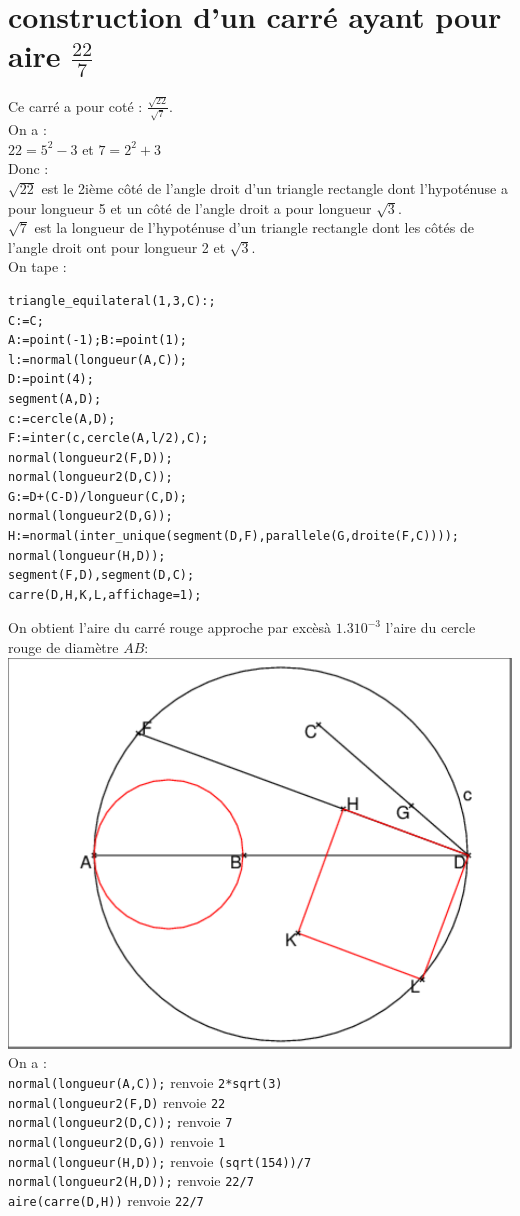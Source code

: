 \documentclass[a4paper,11pt]{book}
\begin{document}
\section{construction d'un carr\'e ayant pour aire $\frac{22}{7}$}
Ce carr\'e a pour cot\'e : $\frac{\sqrt{22}}{\sqrt 7}$.\\
On a :\\
$22=5^2-3$ et $7=2^2+3$\\
Donc :\\
$\sqrt{22}$ est le 2i\`eme c\^ot\'e de l'angle droit d'un triangle 
rectangle dont l'hypot\'enuse a pour longueur 5 et un c\^ot\'e de l'angle droit
a pour longueur $\sqrt 3$.\\
$\sqrt 7$ est la longueur de l'hypot\'enuse d'un triangle rectangle dont les
c\^ot\'es de l'angle droit ont pour longueur 2 et $\sqrt 3$.\\
On tape :
\begin{verbatim}
triangle_equilateral(1,3,C):;
C:=C;
A:=point(-1);B:=point(1);
l:=normal(longueur(A,C));
D:=point(4);
segment(A,D);
c:=cercle(A,D);
F:=inter(c,cercle(A,l/2),C);
normal(longueur2(F,D));
normal(longueur2(D,C));
G:=D+(C-D)/longueur(C,D);
normal(longueur2(D,G));
H:=normal(inter_unique(segment(D,F),parallele(G,droite(F,C))));
normal(longueur(H,D));
segment(F,D),segment(D,C);
carre(D,H,K,L,affichage=1);
\end{verbatim}
On obtient l'aire du carr\'e rouge approche par exc\`es\`a $1.310^{-3}$ 
l'aire du cercle rouge de diam\`etre $AB$:\\
\includegraphics[width=\textwidth]{picarre}\\
On a :\\
{\tt normal(longueur(A,C));} renvoie {\tt 2*sqrt(3)}\\
{\tt normal(longueur2(F,D)} renvoie {\tt 22}\\
{\tt normal(longueur2(D,C));} renvoie {\tt 7}\\
{\tt normal(longueur2(D,G))} renvoie {\tt 1}\\
{\tt normal(longueur(H,D));} renvoie {\tt (sqrt(154))/7}\\
{\tt normal(longueur2(H,D));} renvoie {\tt 22/7}\\
{\tt aire(carre(D,H))} renvoie {\tt 22/7}
\end{document}
